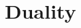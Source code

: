 \documentclass[11pt]{article}
\numberwithin{equation}{section}
\numberwithin{equation}{subsection}
\newcommand{\twoj}{\nu}
\begin{document}

 



\section{Duality}
\end{document}
